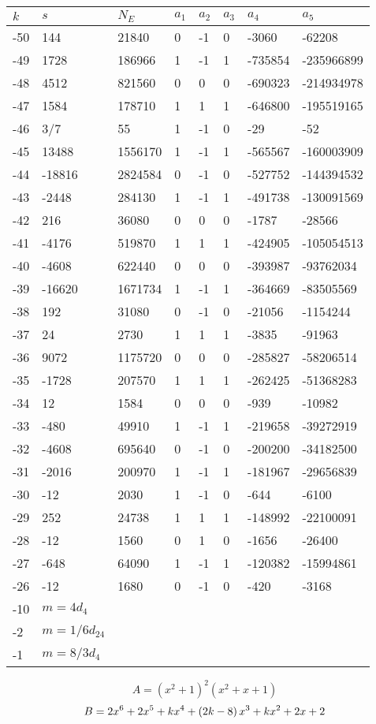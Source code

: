 \documentclass{amsart}
\begin{document}
\begin{longtable}{|l|l|l|lllll|}
\hline
$k$ & $s$ & $N_E$ & $a_1$ & $a_2$ & $a_3$ & $a_4$ & $a_5$\\
\hline
-50&144&21840&0&-1&0&-3060&-62208\\
-49&1728&186966&1&-1&1&-735854&-235966899\\
-48&4512&821560&0&0&0&-690323&-214934978\\
-47&1584&178710&1&1&1&-646800&-195519165\\
-46&3/7&55&1&-1&0&-29&-52\\
-45&13488&1556170&1&-1&1&-565567&-160003909\\
-44&-18816&2824584&0&-1&0&-527752&-144394532\\
-43&-2448&284130&1&-1&1&-491738&-130091569\\
-42&216&36080&0&0&0&-1787&-28566\\
-41&-4176&519870&1&1&1&-424905&-105054513\\
-40&-4608&622440&0&0&0&-393987&-93762034\\
-39&-16620&1671734&1&-1&1&-364669&-83505569\\
-38&192&31080&0&-1&0&-21056&-1154244\\
-37&24&2730&1&1&1&-3835&-91963\\
-36&9072&1175720&0&0&0&-285827&-58206514\\
-35&-1728&207570&1&1&1&-262425&-51368283\\
-34&12&1584&0&0&0&-939&-10982\\
-33&-480&49910&1&-1&1&-219658&-39272919\\
-32&-4608&695640&0&-1&0&-200200&-34182500\\
-31&-2016&200970&1&-1&1&-181967&-29656839\\
-30&-12&2030&1&-1&0&-644&-6100\\
-29&252&24738&1&1&1&-148992&-22100091\\
-28&-12&1560&0&1&0&-1656&-26400\\
-27&-648&64090&1&-1&1&-120382&-15994861\\
-26&-12&1680&0&-1&0&-420&-3168\\
-10&$m=4d_{4}$&&\multicolumn{5}{c|}{}\\
-2&$m=1/6d_{24}$&&\multicolumn{5}{c|}{}\\
-1&$m=8/3d_{4}$&&\multicolumn{5}{c|}{}\\
\hline
\end{longtable}
$$A=(x^2
 + 1)^{2}(x^2
 + x
 + 1)$$
$$B=2\*x^6
 + 2\*x^5
 + k\*x^4
 + \left(2\*k
 - 8\right) \*x^3
 + k\*x^2
 + 2\*x
 + 2$$
\end{document}
